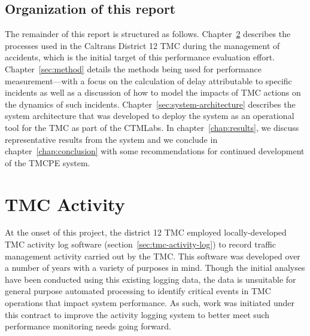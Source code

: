 \documentclass[12pt]{report}
\begin{document}
\section{Organization of this report}
\label{sec:organization}


The remainder of this report is structured as follows.
Chapter~\ref{chap:tmc-activity} describes the processes used in the Caltrans
District 12 \ac{TMC} during the management of accidents, which is the initial
target of this performance evaluation effort.  Chapter~\ref{sec:method} details
the methods being used for performance measurement---with a focus on the
calculation of delay attributable to specific incidents as well as a discussion
of how to model the impacts of \ac{TMC} actions on the dynamics of such
incidents.
Chapter~\ref{sec:system-architecture} describes the system architecture that was
developed to deploy the system as an operational tool for the \ac{TMC} as part
of the \ac{CTMLabs}.  In chapter~\ref{chap:results}, we discuss representative
results from the system and we conclude in chapter~\ref{chap:conclusion} with
some recommendations for continued development of the \ac{TMCPE} system.

\chapter{TMC Activity}
\label{chap:tmc-activity}

At the onset of this project, the district 12 \ac{TMC} employed
locally-developed \ac{TMC} activity log software
(section~\ref{sec:tmc-activity-log}) to record traffic management activity
carried out by the \ac{TMC}.  This software was developed over a number of years
with a variety of purposes in mind.  Though the initial analyses have been
conducted using this existing logging data, the data is unsuitable for general
purpose automated processing to identify critical events in \ac{TMC} operations
that impact system performance.  As such, work was initiated under this contract
to improve the activity logging system to better meet such performance
monitoring needs going forward.
\end{document}
